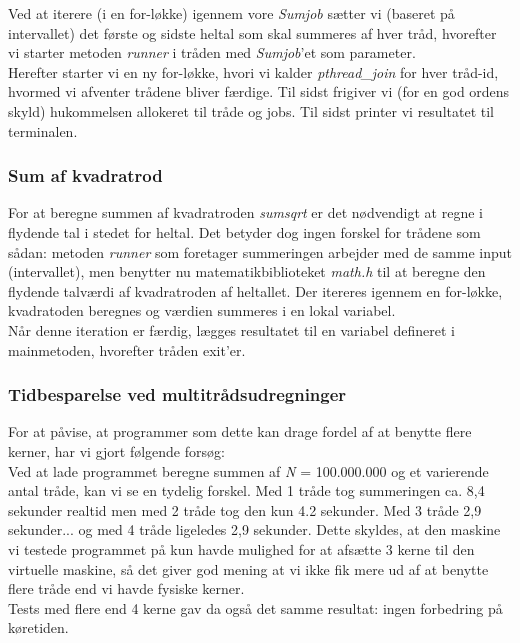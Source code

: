 \documentclass[main.tex]{subfile}
\begin{document}
Ved at iterere (i en for-løkke) igennem vore \textit{Sumjob} sætter vi (baseret på intervallet) det første og sidste heltal som skal summeres af hver tråd, hvorefter vi starter metoden \textit{runner} i tråden med \textit{Sumjob}'et som parameter.\\

Herefter starter vi en ny for-løkke, hvori vi kalder \textit{pthread\_join} for hver tråd-id, hvormed vi afventer trådene bliver færdige. Til sidst frigiver vi (for en god ordens skyld) hukommelsen allokeret til tråde og jobs. Til sidst printer vi resultatet til terminalen.

\subsubsection{Sum af kvadratrod}
For at beregne summen af kvadratroden \textit{sumsqrt} er det nødvendigt at regne i flydende tal i stedet for heltal. Det betyder dog ingen forskel for trådene som sådan: metoden \textit{runner} som foretager summeringen arbejder med de samme input (intervallet), men benytter nu matematikbiblioteket \textit{math.h} til at beregne den flydende talværdi af kvadratroden af heltallet. Der itereres igennem en for-løkke, kvadratoden beregnes og værdien summeres i en lokal variabel.\\

Når denne iteration er færdig, lægges resultatet til en variabel defineret i mainmetoden, hvorefter tråden exit'er.

\subsubsection{Tidbesparelse ved multitrådsudregninger}
For at påvise, at programmer som dette kan drage fordel af at benytte flere kerner, har vi gjort følgende forsøg:\\

Ved at lade programmet beregne summen af \textit{N} = 100.000.000 og et varierende antal tråde, kan vi se en tydelig forskel. Med 1 tråde tog summeringen ca. 8,4 sekunder realtid men med 2 tråde tog den kun 4.2 sekunder. Med 3 tråde 2,9 sekunder... og med 4 tråde ligeledes 2,9 sekunder. Dette skyldes, at den maskine vi testede programmet på kun havde mulighed for at afsætte 3 kerne til den virtuelle maskine, så det giver god mening at vi ikke fik mere ud af at benytte flere tråde end vi havde fysiske kerner.\\

Tests med flere end 4 kerne gav da også det samme resultat: ingen forbedring på køretiden.\\
\end{document}
